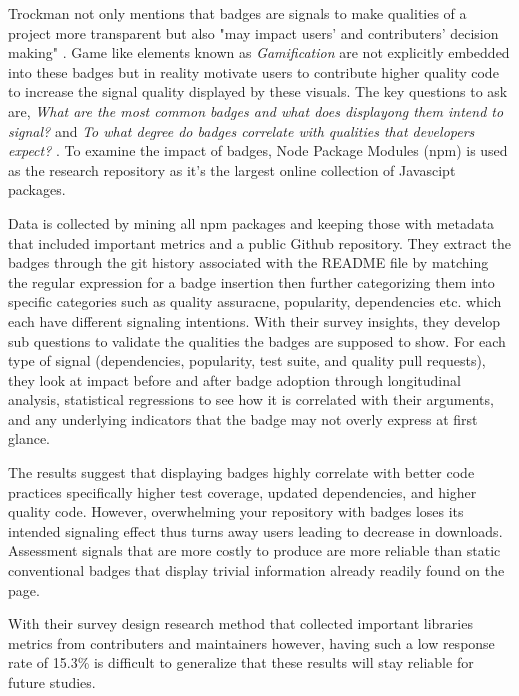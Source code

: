 \documentclass[12pt]{article}
\begin{document}
Trockman not only mentions that badges are signals to make qualities of a project more transparent but also "may impact users' and contributers' decision making" \cite{githubbadges}.
Game like elements known as \textit{Gamification} are not explicitly embedded into these badges but in reality motivate users to contribute higher quality code to increase the signal quality
displayed by these visuals. 
The key questions to ask are, \textit{What are the most common badges and what does displayong them intend to signal?} and \textit{To what degree do badges correlate with qualities that developers expect?} \cite{githubbadges}.
To examine the impact of badges, Node Package Modules (npm) \cite{npm} is used as the research repository as it's the largest online collection of Javascipt packages. 

Data is collected by mining all npm \cite{npm} packages and keeping those with metadata that included 
important metrics and a public Github \cite{github} repository. They extract the badges through the git history associated with 
the README file by matching the regular expression for a badge insertion then further categorizing them into specific categories
such as quality assuracne, popularity, dependencies etc. which each have different signaling intentions.
With their survey insights, they develop sub questions to validate the qualities the badges are supposed to show. 
For each type of signal (dependencies, popularity, test suite, and quality pull requests), they look at 
impact before and after badge adoption through longitudinal analysis, statistical regressions
to see how it is correlated with their arguments, and any underlying indicators that the badge may not overly express at first glance.

The results suggest that displaying badges highly correlate with better code practices specifically higher test coverage, updated dependencies, and higher quality code.
However, overwhelming your repository with badges loses its intended signaling effect thus turns away users leading to decrease in downloads.
Assessment signals that are more costly to produce are more reliable than static conventional badges that display trivial information already readily found on the page.

With their survey design research method that collected important libraries metrics from contributers and maintainers however, having such a low response rate of 15.3\% 
is difficult to generalize that these results will stay reliable for future studies.
\end{document}
